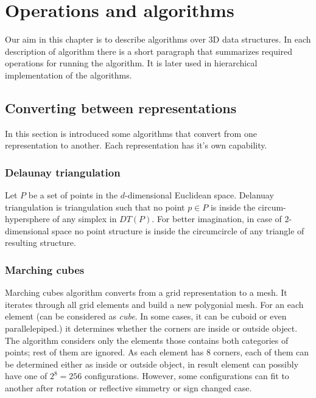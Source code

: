 \chapter{Operations and algorithms}

Our aim in this chapter is to describe algorithms over 3D data structures. In each description of
algorithm there is a short paragraph that summarizes required operations for running the algorithm.
It is later used in hierarchical implementation of the algorithms.

\section{Converting between representations}

In this section is introduced some algorithms that convert from one representation to another. Each 
representation has it's own capability.

\subsection{Delaunay triangulation}

Let $P$ be a set of points in the $d$-dimensional Euclidean space.
Delanuay triangulation is triangulation such that no point $p \in P$ is inside the circum-hypersphere
of any simplex in $DT(P)$. For better imagination, in case of $2$-dimensional space no point
structure is inside the circumcircle of any triangle of resulting structure.

\subsection{Marching cubes}

Marching cubes algorithm converts from a grid representation to a mesh. It iterates through
all grid elements and build a new polygonial mesh. For an each element (can be considered as \emph{cube}.
In some cases, it can be cuboid or even parallelepiped.)
it determines whether the corners are inside or outside object. The algorithm considers only the elements
those contains both categories of points; rest of them are ignored. As each element has 8 corners,
each of them can be determined either as inside or outside object, in result element can possibly
have one of $2^8 = 256$ configurations. However, some configurations can fit to another after rotation
or reflective simmetry or sign changed case.\\


